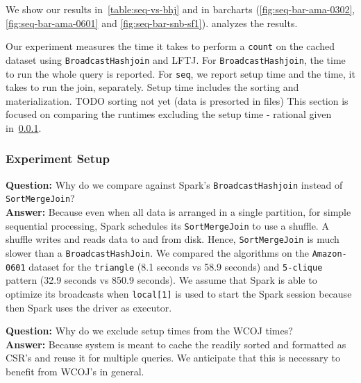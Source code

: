 We show our results in~\cref{table:seq-vs-bhj} and in barcharts (\cref{fig:seq-bar-ama-0302}, \ref{fig:seq-bar-ama-0601} and \ref{fig:seq-bar-snb-sf1}).
 analyzes the results.

Our experiment measures the time it takes to perform a \texttt{count} on the cached dataset using \texttt{BroadcastHashjoin} and
\textsc{LFTJ}.
For \texttt{BroadcastHashjoin}, the time to run the whole query is reported.
For \texttt{seq}, we report setup time and the time, it takes to run the join, separately.
Setup time includes the sorting and materialization.  TODO sorting not yet (data is presorted in files)
This section is focused on comparing the runtimes excluding the setup time - rational given in~\cref{sssec:seq-experiment-rational}.

\subsubsection{Experiment Setup}\label{sssec:seq-experiment-rational}
\textbf{Question:} Why do we compare against Spark's \texttt{BroadcastHashjoin} instead of \texttt{SortMergeJoin}? \\
\textbf{Answer:} Because even when all data is arranged in a single partition, for simple sequential processing, Spark
schedules its \texttt{SortMergeJoin} to use a shuffle.
A shuffle writes and reads data to and from disk.
Hence, \texttt{SortMergeJoin} is much slower than a \texttt{BroadcastHashJoin}.
We compared the algorithms on the \texttt{Amazon-0601} dataset for the \texttt{triangle} (8.1 seconds vs 58.9 seconds) and
\texttt{5-clique} pattern (32.9 seconds vs 850.9 seconds).
We assume that Spark is able to optimize its broadcasts when \texttt{local[1]} is used to start the Spark session because then Spark uses the driver as executor.

\textbf{Question:} Why do we exclude setup times from the WCOJ times?\\
\textbf{Answer:} Because system is meant to cache the readily sorted and formatted as \textsc{CSR}'s and reuse it for multiple queries.
We anticipate that this is necessary to benefit from \textsc{WCOJ}'s in general.


